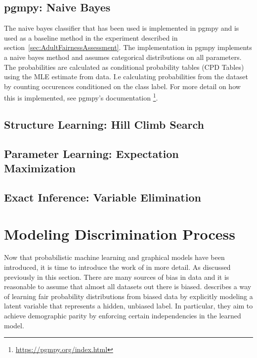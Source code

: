 \subsection{pgmpy: Naive Bayes}

The naive bayes classifier that has been used is implemented in pgmpy and is used as a baseline method in the experiment described in section~\ref{sec:AdultFairnessAssessment}. The implementation in pgmpy implements a naive bayes method and assumes categorical distributions on all parameters. The probabilities are calculated as conditional probability tables (CPD Tables) using the MLE estimate from data. I.e calculating probabilities from the dataset by counting occurences conditioned on the class label. For more detail on how this is implemented, see pgmpy's documentation \footnote{\url{https://pgmpy.org/index.html}}.

\subsection{Structure Learning: Hill Climb Search}
\label{HillClimbSearch}

\subsection{Parameter Learning: Expectation Maximization}
\label{Expectation Maximization}

\subsection{Exact Inference: Variable Elimination}
\label{Variable Elimination}

\section{Modeling Discrimination Process}
\label{sec:paper1}
Now that probabilistic machine learning and graphical models have been introduced, it is time to introduce the work of \citet{Choi:2021:AIII} in more detail. As discussed previously in this section. There are many sources of bias in data and it is reasonable to assume that almost all datasets out there is biased. \citet{Choi:2021:AIII} describes a way of learning fair probability distributions from biased data by explicitly modeling a latent variable that represents a hidden, unbiased label. In particular, they aim to achieve demographic parity by enforcing
certain independencies in the learned model.

